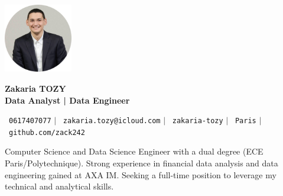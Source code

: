 \documentclass[11pt,a4paper]{article}
\begin{document}
\begin{flushleft}
  \begin{minipage}[c]{0.2\textwidth}
    \includegraphics[width=3cm]{images/profilpicture.png}
  \end{minipage}%
  \begin{minipage}[c]{0.8\textwidth}
    {\Huge \textbf{Zakaria TOZY}} \\[5pt]
    {\Large \textbf{Data Analyst | Data Engineer}}
  \end{minipage}
\end{flushleft}

\vspace{-5pt}

\begin{center}
    \small \faPhone\ \texttt{0617407077} \hspace{1pt} $|$
    \hspace{1pt} \faEnvelope\ \texttt{zakaria.tozy@icloud.com} \hspace{1pt} $|$
    \hspace{1pt} \faLinkedin\ \texttt{zakaria-tozy} \hspace{1pt} $|$
    \hspace{1pt} \faMapMarker\ \texttt{Paris} \hspace{1pt} $|$
    \hspace{1pt} \faGithub\ \texttt{github.com/zack242} \\ \vspace{0pt}
\end{center}

\begin{itemize}[leftmargin=0in, label={}]
\footnotesize{\item{
Computer Science and Data Science Engineer with a dual degree (ECE Paris/Polytechnique). Strong experience in financial data analysis and data engineering gained at AXA IM. Seeking a full-time position to leverage my technical and analytical skills.
}}
\end{itemize}
\end{document}
